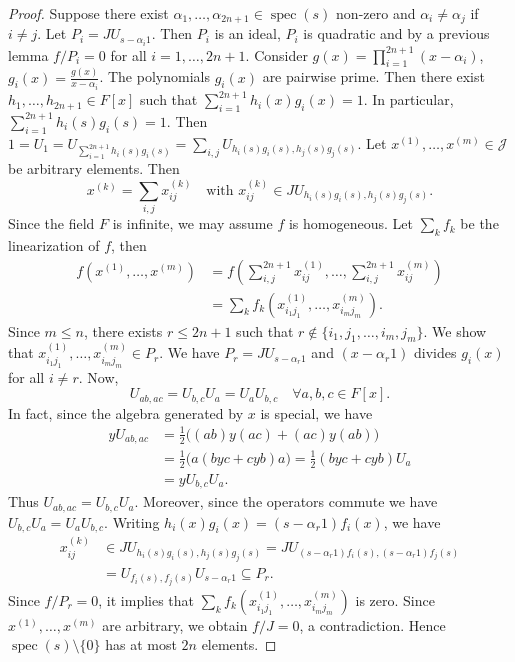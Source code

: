 \documentclass{article}
\begin{document}
\begin{proof}
Suppose there exist $\alpha_1,\dots,\alpha_{2n+1} \in \operatorname{spec}(s)$ non-zero and $\alpha_i \neq \alpha_j$ if $i \neq j$.
Let $P_i = J U_{s-\alpha_i 1}$. Then $P_i$ is an ideal, $P_i$ is quadratic and by a previous lemma $f/P_i = 0$ for all $i=1,\dots,2n+1$.
Consider $g(x) = \prod_{i=1}^{2n+1} (x-\alpha_i)$, $g_i(x) = \frac{g(x)}{x-\alpha_i}$.
The polynomials $g_i(x)$ are pairwise prime. Then there exist $h_1,\dots,h_{2n+1} \in F[x]$ such that $\sum_{i=1}^{2n+1} h_i(x) g_i(x) = 1$.
In particular, $\sum_{i=1}^{2n+1} h_i(s) g_i(s) = 1$.
Then $1 = U_1 = U_{\sum_{i=1}^{2n+1} h_i(s) g_i(s)} = \sum_{i,j} U_{h_i(s) g_i(s), h_j(s) g_j(s)}$.
Let $x^{(1)},\dots,x^{(m)} \in \mathcal{J}$ be arbitrary elements. Then
\[
x^{(k)} = \sum_{i,j} x_{ij}^{(k)} \quad \text{with } x_{ij}^{(k)} \in J U_{h_i(s) g_i(s), h_j(s) g_j(s)}.
\]
Since the field $F$ is infinite, we may assume $f$ is homogeneous. Let $\sum_k f_k$ be the linearization of $f$, then
\begin{align*}
f\left(x^{(1)},\dots,x^{(m)}\right) &= f\left( \sum_{i,j}^{2n+1} x_{ij}^{(1)}, \dots, \sum_{i,j}^{2n+1} x_{ij}^{(m)} \right) \\
&= \sum_k f_k\left( x_{i_1 j_1}^{(1)}, \dots, x_{i_m j_m}^{(m)} \right).
\end{align*}
Since $m \leq n$, there exists $r \leq 2n+1$ such that $r \notin \{i_1,j_1,\dots,i_m,j_m\}$. We show that $x_{i_1 j_1}^{(1)},\dots,x_{i_m j_m}^{(m)} \in P_r$.
We have $P_r = J U_{s-\alpha_r 1}$ and $(x-\alpha_r 1)$ divides $g_i(x)$ for all $i \neq r$. Now,
\[
U_{ab,ac} = U_{b,c} U_a = U_a U_{b,c} \quad \forall a,b,c \in F[x].
\]
In fact, since the algebra generated by $x$ is special, we have
\begin{align*}
y U_{ab,ac} &= \frac{1}{2}\big((ab)y(ac) + (ac)y(ab)\big) \\
&= \frac{1}{2}\big(a(byc + cyb)a\big) = \frac{1}{2}(byc + cyb) U_a \\
&= y U_{b,c} U_a.
\end{align*}
Thus $U_{ab,ac} = U_{b,c} U_a$. Moreover, since the operators commute we have $U_{b,c} U_a = U_a U_{b,c}$.
Writing $h_i(x) g_i(x) = (s-\alpha_r 1) f_i(x)$, we have
\begin{align*}
x_{ij}^{(k)} &\in J U_{h_i(s) g_i(s), h_j(s) g_j(s)} = J U_{(s-\alpha_r 1) f_i(s), (s-\alpha_r 1) f_j(s)} \\
&= U_{f_i(s), f_j(s)} U_{s-\alpha_r 1} \subseteq P_r.
\end{align*}
Since $f/P_r = 0$, it implies that $\sum_k f_k\left( x_{i_1 j_1}^{(1)}, \dots, x_{i_m j_m}^{(m)} \right)$ is zero. Since $x^{(1)},\dots,x^{(m)}$ are arbitrary, we obtain $f/J = 0$, a contradiction. Hence $\operatorname{spec}(s) \setminus \{0\}$ has at most $2n$ elements.
\end{proof}
\end{document}
